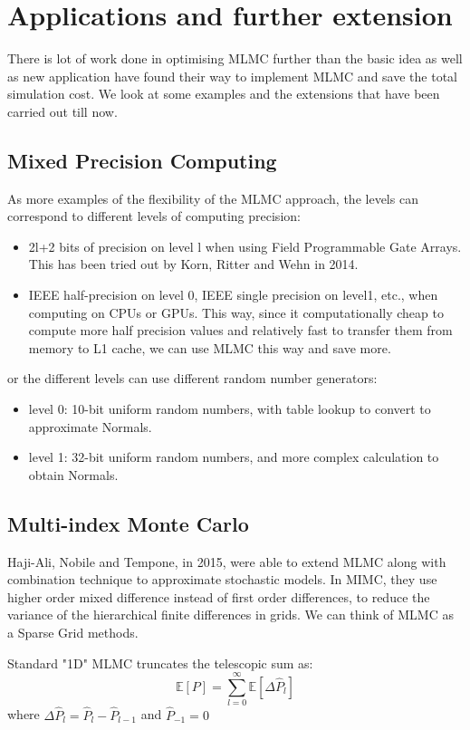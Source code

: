 \documentclass[12pt]{article}
\newcommand{\E}{\mathbb{E}}
\begin{document}
\section{Applications and further extension}
There is lot of work done in optimising MLMC further than the basic idea as well as new application have found their way to implement MLMC and save the total simulation cost. We look at some examples and the extensions that have been carried out till now.
\subsection{Mixed Precision Computing}
As more examples of the flexibility of the MLMC approach, the levels can correspond to different levels of computing precision:
\begin{itemize}
\item 2l+2 bits of precision on level l when using Field Programmable Gate Arrays. This has been tried out by Korn, Ritter and Wehn in 2014.
\item IEEE half-precision on level 0, IEEE single precision on level1, etc., when computing on CPUs or GPUs. This way, since it computationally cheap to compute more half precision values and relatively fast to transfer them from memory to L1 cache, we can use MLMC this way and save more.
\end{itemize}

or the different levels can use different random number generators:
\begin{itemize}
\item level 0: 10-bit uniform random numbers, with table lookup to convert to approximate Normals.
\item level 1: 32-bit uniform random numbers, and more complex calculation to obtain Normals.
\end{itemize}

\subsection{Multi-index Monte Carlo}
Haji-Ali, Nobile and Tempone, in 2015, were able to extend MLMC along with combination technique to approximate stochastic models. In MIMC, they use higher order mixed difference instead of first order differences, to reduce the variance of the hierarchical finite differences in grids. We can think of MLMC as a Sparse Grid methods.

Standard "1D" MLMC truncates the telescopic sum as:
\begin{equation} \E[P] = \sum_{l=0}^{\infty}\E[\Delta\hat{P}_l] \end{equation}
where $\Delta\hat{P}_l = \hat{P}_l - \hat{P}_{l-1} $ and $\hat{P}_{-1} = 0 $
 
\end{document}
